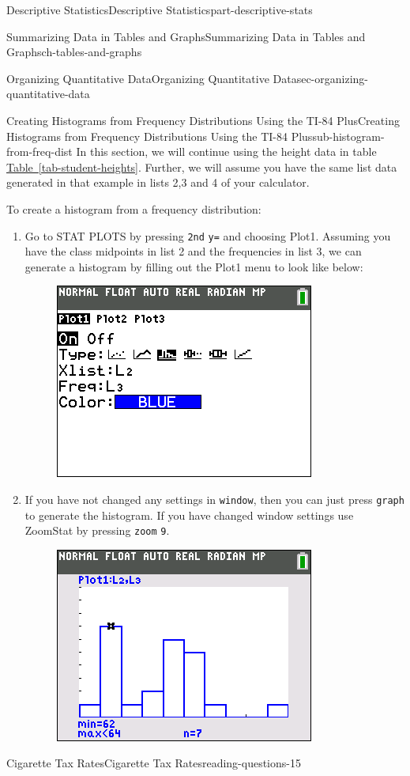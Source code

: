 \documentclass[oneside,10pt,]{book}
\newcommand{\mono}[1]{\texttt{#1}}
\numberwithin{equation}{section}
\begin{document}
\begin{partptx}{Descriptive Statistics}{}{Descriptive Statistics}{}{}{part-descriptive-stats}
\begin{chapterptx}{Summarizing Data in Tables and Graphs}{}{Summarizing Data in Tables and Graphs}{}{}{ch-tables-and-graphs}
\begin{sectionptx}{Organizing Quantitative Data}{}{Organizing Quantitative Data}{}{}{sec-organizing-quantitative-data}
\begin{subsectionptx}{Creating Histograms from Frequency Distributions Using the TI-84 Plus}{}{Creating Histograms from Frequency Distributions Using the TI-84 Plus}{}{}{sub-histogram-from-freq-dist}
In this section, we will continue using the height data in table \hyperref[tab-student-heights]{Table~\ref{tab-student-heights}}. Further, we will assume you have the same list data generated in that example in lists 2,3 and 4 of your calculator.%
\par
\hypertarget{p-66}{}%
To create a histogram from a frequency distribution:%
\leavevmode%
\begin{enumerate}
\item\hypertarget{li-35}{}\hypertarget{p-67}{}%
Go to STAT PLOTS by pressing \mono{2nd} \mono{y=} and choosing Plot1. Assuming you have the class midpoints in list 2 and the frequencies in list 3, we can generate a histogram by filling out the Plot1 menu to look like below:%
\begin{figure}\centering\includegraphics[width=0.4\linewidth]{images/stat-plot-histogram-from-freq-dist.png}
\end{figure}\item\hypertarget{li-36}{}\hypertarget{p-68}{}%
If you have not changed any settings in \mono{window}, then you can just press \mono{graph} to generate the histogram. If you have changed window settings use ZoomStat by pressing \mono{zoom} \mono{9}.%
\begin{figure}\centering\includegraphics[width=0.4\linewidth]{images/histogram-from-freq-dist.png}
\end{figure}\end{enumerate}
\end{subsectionptx}
%
%
\typeout{************************************************}
\typeout{************************************************}
%
\begin{reading-questions-subsection}{Cigarette Tax Rates}{}{Cigarette Tax Rates}{}{}{reading-questions-15}

\end{reading-questions-subsection}
\end{sectionptx}
\end{chapterptx}
\end{partptx}
\end{document}
